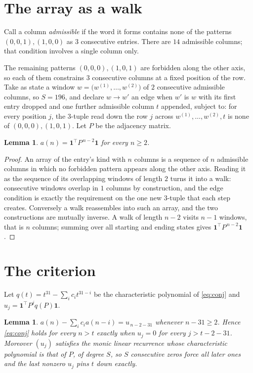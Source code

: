 \documentclass[11pt,a4paper]{article}
\theoremstyle{plain}
\newtheorem{lemma}[theorem]{Lemma}
\theoremstyle{definition}
\begin{document}
\section{The array as a walk}

Call a column \emph{admissible} if the word it forms contains none of the patterns
$(0,0,1), (1,0,0)$ as $3$ consecutive entries. There are $14$ admissible columns; that condition
involves a single column only.

The remaining patterns $(0,0,0), (1,0,1)$ are forbidden along the other axis, so each of them
constrains $3$ consecutive columns at a fixed position of the row. Take as state a
window $w=\bigl(w^{(1)},\dots,w^{(2)}\bigr)$ of $2$ consecutive admissible
columns, so $S=196$, and declare $w\to w'$ an edge when $w'$ is $w$ with its first entry
dropped and one further admissible column $t$ appended, subject to: for every position
$j$, the $3$-tuple read down the row $j$ across $w^{(1)},\dots,w^{(2)},t$
is none of $(0,0,0), (1,0,1)$. Let $P$ be the adjacency matrix.

\begin{lemma}\label{lem:walk}
$a(n)=\mathbf{1}^{\!\top}P^{\,n-2}\mathbf{1}$ for every $n\ge2$.
\end{lemma}

\begin{proof}
An array of the entry's kind with $n$ columns is a sequence of $n$ admissible columns in
which no forbidden pattern appears along the other axis. Reading it as the sequence of its
overlapping windows of length $2$ turns it into a walk: consecutive windows overlap in
$1$ columns by construction, and the edge condition is exactly the requirement on the one
new $3$-tuple that each step creates. Conversely a walk reassembles into such an array,
and the two constructions are mutually inverse. A walk of length $n-2$ visits $n-1$
windows, that is $n$ columns; summing over all starting and ending states gives
$\mathbf{1}^{\!\top}P^{\,n-2}\mathbf{1}$.
\end{proof}

\section{The criterion}

Let $q(t)=t^{31}-\sum_i c_i t^{31-i}$ be the characteristic polynomial of
\eqref{eq:conj} and $u_j=\mathbf{1}^{\!\top}P^{j}q(P)\mathbf{1}$.

\begin{lemma}\label{lem:crit}
$a(n)-\sum_i c_i a(n-i)=u_{\,n-2-31}$ whenever $n-31\ge2$. Hence
\eqref{eq:conj} holds for every $n>t$ exactly when $u_j=0$ for every
$j>t-2-31$. Moreover $(u_j)$ satisfies the monic linear recurrence whose
characteristic polynomial is that of $P$, of degree $S$, so $S$ consecutive zeros force all
later ones and the last nonzero $u_j$ pins $t$ down exactly.
\end{lemma}
\end{document}
